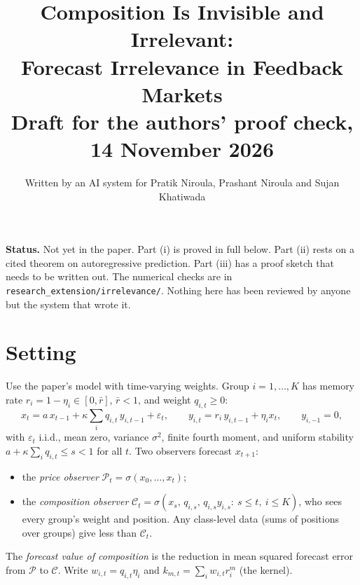 \documentclass[11pt]{article}
\title{Composition Is Invisible and Irrelevant:\\ Forecast Irrelevance in Feedback Markets\\[4pt]\large Draft for the authors' proof check, 14 November 2026}
\author{Written by an AI system for Pratik Niroula, Prashant Niroula and Sujan Khatiwada}
\date{}
\theoremstyle{remark}\newtheorem{remark}[theorem]{Remark}
\begin{document}
\maketitle
\noindent\textbf{Status.} Not yet in the paper. Part (i) is proved in full below. Part (ii) rests on a cited theorem on autoregressive prediction. Part (iii) has a proof sketch that needs to be written out. The numerical checks are in \texttt{research\_extension/\allowbreak irrelevance/}. Nothing here has been reviewed by anyone but the system that wrote it.

\section{Setting}
Use the paper's model with time-varying weights. Group $i=1,\dots,K$ has memory rate $r_i=1-\eta_i\in[0,\bar r]$, $\bar r<1$, and weight $q_{i,t}\ge 0$:
\[
x_t=a\,x_{t-1}+\kappa\sum_i q_{i,t}\,y_{i,t-1}+\varepsilon_t,\qquad y_{i,t}=r_i\,y_{i,t-1}+\eta_i x_t,\qquad y_{i,-1}=0,
\]
with $\varepsilon_t$ i.i.d., mean zero, variance $\sigma^2$, finite fourth moment, and uniform stability $a+\kappa\sum_i q_{i,t}\le s<1$ for all $t$. Two observers forecast $x_{t+1}$:
\begin{itemize}[itemsep=1pt]
\item the \emph{price observer} $\mathcal P_t=\sigma(x_0,\dots,x_t)$;
\item the \emph{composition observer} $\mathcal C_t=\sigma(x_s,\,q_{i,s},\,q_{i,s}y_{i,s}:\ s\le t,\ i\le K)$, who sees every group's weight and position. Any class-level data (sums of positions over groups) give less than $\mathcal C_t$.
\end{itemize}
The \emph{forecast value of composition} is the reduction in mean squared forecast error from $\mathcal P$ to $\mathcal C$. Write $w_{i,t}=q_{i,t}\eta_i$ and $k_{m,t}=\sum_i w_{i,t}r_i^m$ (the kernel).
\end{document}
